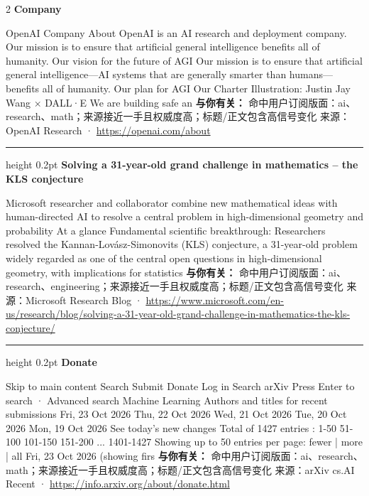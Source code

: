 \documentclass[10.5pt]{ctexart}
\begin{document}
\begin{multicols}{2}
{\large\bfseries Company}\par
OpenAI Company About OpenAI is an AI research and deployment company. Our mission is to ensure that artificial general intelligence benefits all of humanity. Our vision for the future of AGI Our mission is to ensure that artificial general intelligence—AI systems that are generally smarter than humans—benefits all of humanity. Our plan for AGI Our Charter Illustration: Justin Jay Wang × DALL·E We are building safe an
\textbf{与你有关：} 命中用户订阅版面：ai、research、math；来源接近一手且权威度高；标题/正文包含高信号变化
{\footnotesize\color{ormuted} 来源：OpenAI Research · \url{https://openai.com/about}}
\vspace{2mm}
\hrule height 0.2pt
\vspace{2mm}
{\large\bfseries Solving a 31-year-old grand challenge in mathematics – the KLS conjecture}\par
Microsoft researcher and collaborator combine new mathematical ideas with human-directed AI to resolve a central problem in high-dimensional geometry and probability At a glance Fundamental scientific breakthrough: Researchers resolved the Kannan-Lovász-Simonovits (KLS) conjecture, a 31-year-old problem widely regarded as one of the central open questions in high-dimensional geometry, with implications for statistics
\textbf{与你有关：} 命中用户订阅版面：ai、research、engineering；来源接近一手且权威度高；标题/正文包含高信号变化
{\footnotesize\color{ormuted} 来源：Microsoft Research Blog · \url{https://www.microsoft.com/en-us/research/blog/solving-a-31-year-old-grand-challenge-in-mathematics-the-kls-conjecture/}}
\vspace{2mm}
\hrule height 0.2pt
\vspace{2mm}
{\large\bfseries Donate}\par
Skip to main content Search Submit Donate Log in Search arXiv Press Enter to search · Advanced search Machine Learning Authors and titles for recent submissions Fri, 23 Oct 2026 Thu, 22 Oct 2026 Wed, 21 Oct 2026 Tue, 20 Oct 2026 Mon, 19 Oct 2026 See today's new changes Total of 1427 entries : 1-50 51-100 101-150 151-200 ... 1401-1427 Showing up to 50 entries per page: fewer | more | all Fri, 23 Oct 2026 (showing firs
\textbf{与你有关：} 命中用户订阅版面：ai、research、math；来源接近一手且权威度高；标题/正文包含高信号变化
{\footnotesize\color{ormuted} 来源：arXiv cs.AI Recent · \url{https://info.arxiv.org/about/donate.html}}
\vspace{2mm}

\end{multicols}
\end{document}
